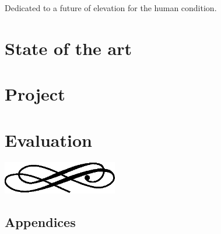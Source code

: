 



\frenchspacing
\raggedbottom
{}
\pagestyle{plain}

\cleardoublepage
\begin{center}
{\calligra
Dedicated to a future of elevation for the human condition.}
\end{center}
\cleardoublepage
\cleardoublepage\tableofcontents
\clearpage
\cleardoublepage
\newpage
{}
\pagestyle{scrheadings}
\sloppy

\part{State of the art}\label{prt:stateOfArt}

\part{Project}\label{prt:project}



\part{Evaluation}\label{prt:evaluation}




\begin{center}
  \includegraphics[width=5cm]{img/ornament.eps}  
\end{center}

\begin{appendices}
\part{Appendices}

%

\end{appendices}

\clearpage
\nocite{*}
{}



\printindex


